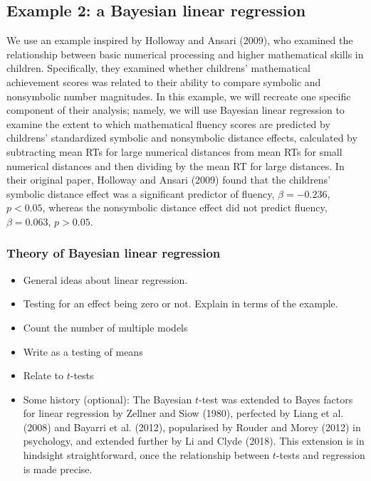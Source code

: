 \documentclass[english,,doc,floatsintext]{apa6}
\providecommand{\tightlist}{%
  \setlength{\itemsep}{0pt}\setlength{\parskip}{0pt}}
\begin{document}
\hypertarget{example-2-a-bayesian-linear-regression}{%
\subsection{Example 2: a Bayesian linear regression}\label{example-2-a-bayesian-linear-regression}}

We use an example inspired by Holloway and Ansari (2009), who examined the relationship between basic numerical processing and higher mathematical skills in children. Specifically, they examined whether childrens' mathematical achievement scores was related to their ability to compare symbolic and nonsymbolic number magnitudes. In this example, we will recreate one specific component of their analysis; namely, we will use Bayesian linear regression to examine the extent to which mathematical fluency scores are predicted by childrens' standardized symbolic and nonsymbolic distance effects, calculated by subtracting mean RTs for large numerical distances from mean RTs for small numerical distances and then dividing by the mean RT for large distances. In their original paper, Holloway and Ansari (2009) found that the childrens' symbolic distance effect was a significant predictor of fluency, \(\beta = -0.236\), \(p<0.05\), whereas the nonsymbolic distance effect did not predict fluency, \(\beta=0.063\), \(p>0.05\).

\hypertarget{theory-of-bayesian-linear-regression}{%
\subsubsection{Theory of Bayesian linear regression}\label{theory-of-bayesian-linear-regression}}

\begin{itemize}
\tightlist
\item
  General ideas about linear regression.
\item
  Testing for an effect being zero or not. Explain in terms of the example.
\item
  Count the number of multiple models
\item
  Write as a testing of means
\item
  Relate to \(t\)-tests
\item
  Some history (optional): The Bayesian \(t\)-test was extended to Bayes factors for linear regression by Zellner and Siow (1980), perfected by Liang et al. (2008) and Bayarri et al. (2012), popularised by Rouder and Morey (2012) in psychology, and extended further by Li and Clyde (2018). This extension is in hindsight straightforward, once the relationship between \(t\)-tests and regression is made precise.
\end{itemize}
\end{document}
